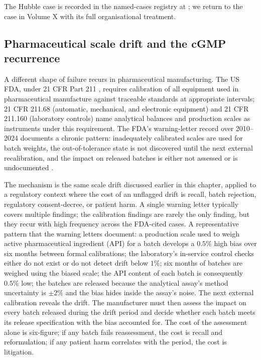 The Hubble case is recorded in the named-cases registry at
; we
return to the case in Volume X with its full organisational
treatment.

\subsection{Pharmaceutical scale drift and the cGMP recurrence}

A different shape of failure recurs in pharmaceutical manufacturing.
The US FDA, under 21 CFR Part 211
\cite{std:ch03t3-fda-21cfr211}, requires calibration of all
equipment used in pharmaceutical manufacture against traceable
standards at appropriate intervals; 21 CFR 211.68 (automatic,
mechanical, and electronic equipment) and 21 CFR 211.160
(laboratory controls) name analytical balances and production
scales as instruments under this requirement. The FDA's
warning-letter record over 2010--2024 documents a chronic pattern:
inadequately calibrated scales are used for batch weights, the
out-of-tolerance state is not discovered until the next external
recalibration, and the impact on released batches is either not
assessed or is undocumented \cite{web:ch03t3-fda-warning-letters}.

The mechanism is the same scale drift discussed earlier in this
chapter, applied to a regulatory context where the cost of an
unflagged drift is recall, batch rejection, regulatory
consent-decree, or patient harm. A single warning letter typically
covers multiple findings; the calibration findings are rarely the
only finding, but they recur with high frequency across the
FDA-cited cases. A representative pattern that the warning letters
document: a production scale used to weigh active pharmaceutical
ingredient (API) for a batch develops a $0.5\%$ high bias over six
months between formal calibrations; the laboratory's in-service
control checks either do not exist or do not detect drift below
$1\%$; six months of batches are weighed using the biased scale;
the API content of each batch is consequently $0.5\%$ low; the
batches are released because the analytical assay's method
uncertainty is $\pm 2\%$ and the bias hides inside the assay's
noise. The next external calibration reveals the drift. The
manufacturer must then assess the impact on every batch released
during the drift period and decide whether each batch meets its
release specification with the bias accounted for. The cost of the
assessment alone is six-figure; if any batch fails reassessment,
the cost is recall and reformulation; if any patient harm
correlates with the period, the cost is litigation.


